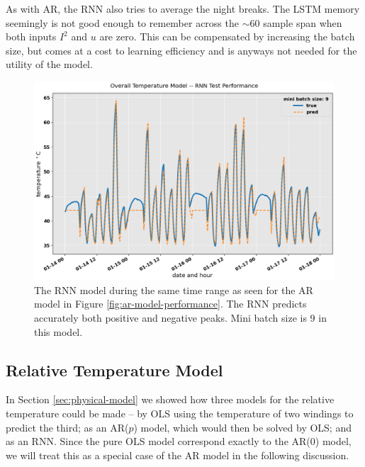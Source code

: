 \documentclass[]{article}
\begin{document}
As with AR, the RNN also tries to average the night breaks. The LSTM memory seemingly is not good enough to remember across the $\sim 60$ sample span when both inputs $I^2$ and $u$ are zero. This can be compensated by increasing the batch size, but comes at a cost to learning efficiency and is anyways not needed for the utility of the model.

\begin{figure}[!h]
	\centering
	\includegraphics[width=1\linewidth]{./figs/rnn-model-performance.png}
	\caption{The RNN model during the same time range as seen for the AR model in Figure \ref{fig:ar-model-performance}. The RNN predicts accurately both positive and negative peaks. Mini batch size is 9 in this model.}
	\label{fig:rnn-model-performance}
\end{figure}

\subsection{Relative Temperature Model} \label{sec:results-relative}
In Section \ref{sec:physical-model} we showed how three models for the relative temperature could be made -- by OLS using the temperature of two windings to predict the third; as an AR($p$) model, which would then be solved by OLS; and as an RNN. Since the pure OLS model correspond exactly to the AR($0$) model, we will treat this as a special case of the AR model in the following discussion.
\end{document}

